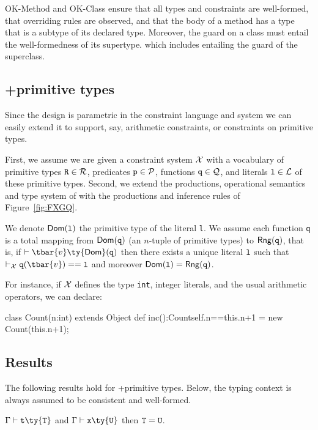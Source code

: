 {\sc OK-Method} and {\sc OK-Class} ensure that all types and constraints are well-formed, that overriding rules are observed, and that the body of a method has a type that is a subtype of its declared type. Moreover, the guard on a class must entail the well-formedness of its supertype. which includes entailing the guard of the superclass.


\subsection{\FXG+primitive types}\label{sec:Q}

Since the \FXG design is parametric in the constraint language and system we can easily extend it to support, say, arithmetic constraints, or constraints on primitive types.

First, we assume we are given a constraint system $\cal X$ with a vocabulary of primitive types ${\tt R}\in\cal R$, predicates ${\tt p}\in\cal P$, functions ${\tt q}\in\cal Q$, and literals ${\tt l}\in\cal L$ of these primitive types. Second, we extend the productions, operational semantics and type system of \FXG with the productions and inference rules of Figure~\ref{fig:FXGQ}.

We denote $\Dom({\tt l})$ the primitive type of the literal {\tt l}. We assume each function {\tt q}
is a total mapping from ${\sf Dom}({\tt q})$ (an $n$-tuple of primitive types) to $\Img({\tt q})$, that is, if $\vdash \tbar{v}\ty{\sf Dom}({\tt q})$ then there exists a unique literal $\tt l$ such that $\vdashQ {\tt q}(\tbar{v})=={\tt l}$ and moreover $\Dom({\tt l})=\Img({\tt q})$.

For instance, if $\cal X$ defines the type {\tt int}, integer literals, and the usual arithmetic operators, we can declare:

\begin{xten}
class Count(n:int) extends Object {
  def inc():Count{self.n==this.n+1} =
  	new Count(this.n+1);
}
\end{xten}


\subsection{Results}
\label{sec:results}
The following results hold for \FXG+primitive types. Below, the typing context is always assumed to be consistent and well-formed.


\begin{theorem}
$\Gamma\vdash {\tt t}\ty{\tt T}$ and $\Gamma\vdash {\tt x}\ty{\tt U}$ then ${\tt T}={\tt U}$.
\end{theorem}

